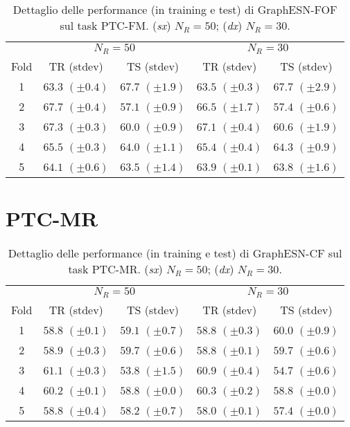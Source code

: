 

\begin{table}[tbph]
\footnotesize
\caption[Dettaglio performance: GraphESN-FOF su PTC-FM]{Dettaglio delle performance (in training e test) di GraphESN-FOF sul task PTC-FM. (\emph{sx}) $N_R=50$; (\emph{dx}) $N_R=30$.}
\label{app:esp:PTC-FM-FOF}
\centering
\begin{tabular}{c*{4}{c}}
\toprule
& \multicolumn{2}{c}{$N_R=50$} & \multicolumn{2}{c}{$N_R=30$}\\
Fold & TR (stdev) & TS (stdev) & TR (stdev) & TS (stdev)\\
\midrule
1 & $63.3$ $(\pm 0.4)$ & $67.7$ $(\pm 1.9)$ & $63.5$ $(\pm 0.3)$ & $67.7$ $(\pm 2.9)$\\
2 & $67.7$ $(\pm 0.4)$ & $57.1$ $(\pm 0.9)$ & $66.5$ $(\pm 1.7)$ & $57.4$ $(\pm 0.6)$\\
3 & $67.3$ $(\pm 0.3)$ & $60.0$ $(\pm 0.9)$ & $67.1$ $(\pm 0.4)$ & $60.6$ $(\pm 1.9)$\\
4 & $65.5$ $(\pm 0.3)$ & $64.0$ $(\pm 1.1)$ & $65.4$ $(\pm 0.4)$ & $64.3$ $(\pm 0.9)$\\
5 & $64.1$ $(\pm 0.6)$ & $63.5$ $(\pm 1.4)$ & $63.9$ $(\pm 0.1)$ & $63.8$ $(\pm 1.6)$\\
\bottomrule
\end{tabular}
\end{table}


\section{PTC-MR}


\begin{table}[tbph]
\footnotesize
\caption[Dettaglio performance: GraphESN-CF su PTC-MR]{Dettaglio delle performance (in training e test) di GraphESN-CF sul task PTC-MR. (\emph{sx}) $N_R=50$; (\emph{dx}) $N_R=30$.}
\label{app:esp:PTC-MR-CF}
\centering
\begin{tabular}{c*{4}{c}}
\toprule
& \multicolumn{2}{c}{$N_R=50$} & \multicolumn{2}{c}{$N_R=30$}\\
Fold & TR (stdev) & TS (stdev) & TR (stdev) & TS (stdev)\\
\midrule
1 & $58.8$ $(\pm 0.1)$ & $59.1$ $(\pm 0.7)$ & $58.8$ $(\pm 0.3)$ & $60.0$ $(\pm 0.9)$\\
2 & $58.9$ $(\pm 0.3)$ & $59.7$ $(\pm 0.6)$ & $58.8$ $(\pm 0.1)$ & $59.7$ $(\pm 0.6)$\\
3 & $61.1$ $(\pm 0.3)$ & $53.8$ $(\pm 1.5)$ & $60.9$ $(\pm 0.4)$ & $54.7$ $(\pm 0.6)$\\
4 & $60.2$ $(\pm 0.1)$ & $58.8$ $(\pm 0.0)$ & $60.3$ $(\pm 0.2)$ & $58.8$ $(\pm 0.0)$\\
5 & $58.8$ $(\pm 0.4)$ & $58.2$ $(\pm 0.7)$ & $58.0$ $(\pm 0.1)$ & $57.4$ $(\pm 0.0)$\\
\bottomrule
\end{tabular}
\end{table}

